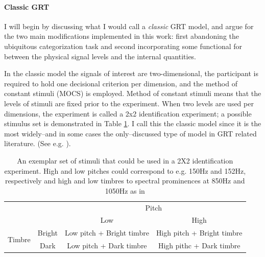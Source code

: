 \documentclass{article}\usepackage{knitr}
\begin{document}
\paragraph{Classic GRT}

I will begin by discussing what I would call a \textit{classic} GRT model, and argue for the two main modifications implemented in this work: first abandoning the ubiquitous categorization task and second incorporating some functional for between the physical signal levels and the internal quantities. 

In the classic model the signals of interest are two-dimensional, the participant is required to hold one decisional criterion per dimension, and the method of constant stimuli (MOCS) is employed. Method of constant stimuli means that the levels of stimuli are fixed prior to the experiment. When two levels are used per dimensions, the experiment is called a 2x2 identification experiment;  a possible stimulus set is demonstrated in Table \ref{table:classicGRT}. I call this the classic model since it is the most widely--and in some cases the only--discussed type of model in GRT related literature. (See e.g. \cite{ashby2015, ashby1986, cohen2003, kadlec1992, silbert2010, silbert2013}). 

\begin{table}[!htb]
 \centering
  \caption{An exemplar set of stimuli that could be used in a 2X2 identification experiment. High and low pitches could correspond to e.g. 150Hz and 152Hz, respectively and high and low timbres to spectral prominences at 850Hz and 1050Hz as in \cite{silbert2009}}
  \vspace{0.5cm}
  \label{table:classicGRT}
   \begin{tabular}{rccc}
    \hline
     &       &         \multicolumn{2}{c}{Pitch} \\
                       \cline{3-4}
             &         & Low             & High   \\
     \hline
    \multirow{2}{*}{Timbre} 
            & Bright & \parbox[t]{5cm}{Low pitch + Bright timbre\\}& \parbox[t]{5cm}{High pitch + Bright timbre\\}\\
            & Dark    & \parbox[t]{5cm}{Low pitch + Dark timbre \\}  & \parbox[t]{5cm}{High pithc + Dark timbre \\ }\\
     \hline
    \end{tabular}
\end{table}
\end{document}
